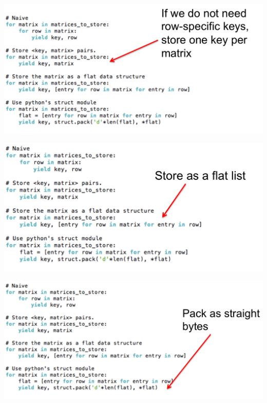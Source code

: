 \documentclass{beamer}
\begin{document}
\begin{frame}

\begin{center}
\includegraphics[height=2.in]{./images/small2.png}
\end{center}

\end{frame}

\begin{frame}

\begin{center}
\includegraphics[height=2.in]{./images/small3.png}
\end{center}

\end{frame}

\begin{frame}

\begin{center}
\includegraphics[height=2.in]{./images/small4.png}
\end{center}

\end{frame}
\end{document}
